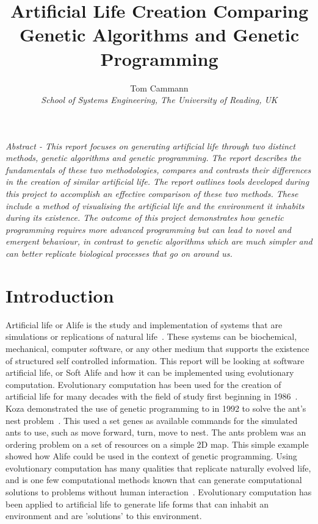 \documentclass[12pt]{article}
\begin{document}
\title{\LARGE \bf Artificial Life Creation Comparing Genetic Algorithms and Genetic Programming\vspace{1cm}}
\author{\small Tom Cammann\\
\small \it{School of Systems Engineering, The University of Reading, UK}}
\date{}
\tableofcontents
\listoffigures
\maketitle


\renewcommand{\abstractname}{}
\begin{onecolabstract}
\noindent \it Abstract - This report focuses on generating artificial life through two distinct methods, genetic algorithms and genetic programming. The
report describes the fundamentals of these two methodologies, compares and contrasts their differences in the creation of similar 
artificial life. The report outlines tools developed during this project to accomplish an effective comparison of these two methods.
These include a method of visualising the artificial life and the environment it inhabits during its existence. The outcome of 
this project demonstrates how genetic programming requires more advanced programming but can lead to novel and emergent behaviour,
in contrast to genetic algorithms which are much simpler and can better replicate biological processes that go on around us. 
\end{onecolabstract}


\section{Introduction}

Artificial life or Alife is the study and implementation of systems that are simulations or replications of natural life~\cite{adami98}.
These systems can be biochemical, mechanical, computer software, or any other medium that supports the existence of structured self controlled information.
This report will be looking at software artificial life, or Soft Alife and how it can be implemented using evolutionary computation.
Evolutionary computation has been used for the creation of artificial life for many decades with the field of study first beginning in 1986~\cite{mit99}.
Koza demonstrated the use of genetic programming to  in 1992 to solve the ant's nest problem~\cite[~p.329]{koza92}. This used a set genes as available
commands for the simulated ants to use, such as move forward, turn, move to nest. The ants problem was an ordering problem on a set of resources on a simple
2D map. This simple example showed how Alife could be used in the context of genetic programming.
Using evolutionary computation has many qualities that replicate naturally evolved life, and is one few computational methods known that
can generate computational solutions to problems without human interaction~\cite{koza91}.
Evolutionary computation has been applied to artificial life to generate life forms that can inhabit an environment and are 'solutions' to this environment.
\end{document}

